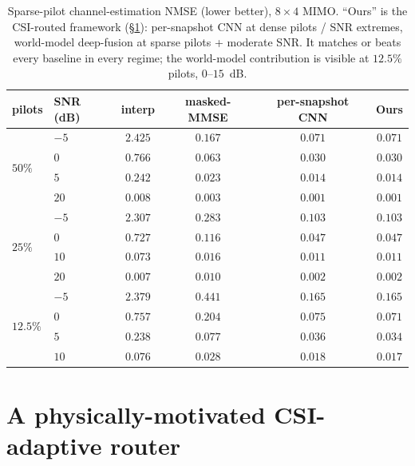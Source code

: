 \documentclass[11pt]{article}
\begin{document}
\begin{table}[h]
\centering
\small
\begin{tabular}{llcccc}
\toprule
pilots & SNR (dB) & interp & masked-MMSE & per-snapshot CNN & \textbf{Ours} \\
\midrule
\multirow{4}{*}{$50\%$}
& $-5$ & $2.425$ & $0.167$ & $\mathbf{0.071}$ & $\mathbf{0.071}$ \\
& $0$  & $0.766$ & $0.063$ & $\mathbf{0.030}$ & $\mathbf{0.030}$ \\
& $5$  & $0.242$ & $0.023$ & $\mathbf{0.014}$ & $\mathbf{0.014}$ \\
& $20$ & $0.008$ & $0.003$ & $\mathbf{0.001}$ & $\mathbf{0.001}$ \\
\midrule
\multirow{4}{*}{$25\%$}
& $-5$ & $2.307$ & $0.283$ & $\mathbf{0.103}$ & $\mathbf{0.103}$ \\
& $0$  & $0.727$ & $0.116$ & $\mathbf{0.047}$ & $\mathbf{0.047}$ \\
& $10$ & $0.073$ & $0.016$ & $\mathbf{0.011}$ & $\mathbf{0.011}$ \\
& $20$ & $0.007$ & $0.010$ & $\mathbf{0.002}$ & $\mathbf{0.002}$ \\
\midrule
\multirow{4}{*}{$12.5\%$}
& $-5$ & $2.379$ & $0.441$ & $\mathbf{0.165}$ & $\mathbf{0.165}$ \\
& $0$  & $0.757$ & $0.204$ & $0.075$ & $\mathbf{0.071}$ \\
& $5$  & $0.238$ & $0.077$ & $0.036$ & $\mathbf{0.034}$ \\
& $10$ & $0.076$ & $0.028$ & $0.018$ & $\mathbf{0.017}$ \\
\bottomrule
\end{tabular}
\caption{Sparse-pilot channel-estimation NMSE (lower better), $8\times4$ MIMO. ``Ours'' is the
CSI-routed framework (\S\ref{sec:router}): per-snapshot CNN at dense pilots / SNR extremes,
world-model deep-fusion at sparse pilots + moderate SNR. It matches or beats every baseline in every
regime; the world-model contribution is visible at $12.5\%$ pilots, $0$--$15$~dB.}
\label{tab:est}
\end{table}

\section{A physically-motivated CSI-adaptive router}\label{sec:router}
\end{document}
